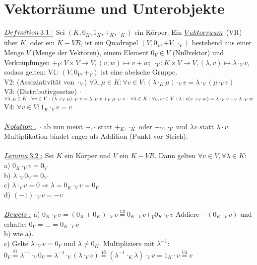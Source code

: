 \documentclass[fleqn, a4paper, 11pt]{article}
\begin{document}
\section{Vektorr\"aume und Unterobjekte}

$\uline{Definition\:3.1:}$ Sei $(K,0_{K},1_{K},+_{K},\cdot_{K})$ ein K\"orper. Ein $\uline{Vektorraum}$ (VR) \"uber $K$, oder ein $K-VR$, ist ein Quadrupel $(V,0_{V},+{V},\cdot_{V})$ bestehend aus einer Menge $V$ (Menge der Vektoren), einem Element $0_{V}\in V$ (Nullvektor) und Verkn\"upfungen $+_{V}:V\times V\rightarrow V,(v,w)\mapsto v+w;\: \cdot_{V}:K\times V\rightarrow V,(\lambda,v)\mapsto\lambda\cdot_{V} v$, sodass gelten: V1: $(V,0_{V},+_{V})$ ist eine abelsche Gruppe.\\
V2: (Assoziativit\"at von $\cdot_{V}$) $\forall\lambda,\mu\in K:\forall v\in V:(\lambda\cdot_{K}\mu)\cdot_{V} v=\lambda\cdot_{V}(\mu\cdot_{V} v)$\\
V3: (Distributivgesetze) $\cdot$ $\forall\lambda,\mu\in K:\forall v\in V:(\lambda+_{V}\mu)\cdot_{V} v=\lambda\cdot_{V} v+_{V}\mu\cdot_{V} v\\
\cdot\; \forall\lambda\in K:\forall v,w\in V:\lambda\cdot v(v+_{V} w)=\lambda\cdot_{V} v+_{V}\lambda\cdot_{V} w$\\
V4: $\forall v\in V:1_{K}\cdot_{V} v=v$\\
\\
$\uline{Notation:}$ $\cdot$ ab nun meist $+,\cdot$ statt $+_{K},\cdot_{K}$ oder $+_{V},\cdot_{V}$ und $\lambda v$ statt $\lambda\cdot v$. Multiplikation bindet enger als Addition (\dq Punkt vor Strich\dq).\\
\\
$\uline{Lemma\:3.2:}$ Sei $K$ ein K\"orper und $V$ ein $K-VR$. Dann gelten $\forall v\in V,\forall\lambda\in K:$ a) $0_{K}\cdot_{V} v=0_{V}$\\
b) $\lambda\cdot_{V} 0_{V}=0_{V}$\\
c) $\lambda\cdot_{V} v=0\Rightarrow \lambda=0_{K}\cdot_{V} v=0_{V}$\\
d) $(-1)\cdot_{V} v =-v$\\
\\
$\uline{Beweis:}$ a) $0_{K}\cdot_{V} v=(0_{K}+0_{K})\cdot_{V} v\stackrel{V3}{=} 0_{K}\cdot_{V} v+_{V}0_{K}\cdot_{V} v$ Addiere $-(0_{K}\cdot_{V} v)$ und erhalte: $0_{V}=...=0_{K}\cdot_{V} v$\\
b) wie a).\\
c) Gelte $\lambda\cdot_{V} v=0_{V}$ und $\lambda\neq0_{K}$. Multipliziere mit $\lambda^{-1}$: $0_{V}\stackrel{b)}{=}\lambda^{-1}\cdot_{V}0_{V}=\lambda^{-1}\cdot_{V}(\lambda\cdot_{V} v)\stackrel{V2}{=}(\lambda^{-1}\cdot_{K}\lambda)\cdot_{V} v=1_{K}\cdot v\stackrel{V4}{=} v$\\
\end{document}
